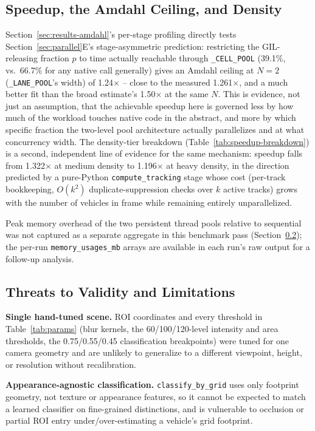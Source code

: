 \documentclass[conference]{IEEEtran}
\newcommand{\code}[1]{\texttt{#1}}
\begin{document}
\subsection{Speedup, the Amdahl Ceiling, and Density}
Section~\ref{sec:results-amdahl}'s per-stage profiling directly tests
Section~\ref{sec:parallel}E's stage-asymmetric prediction: restricting
the GIL-releasing fraction $p$ to time actually reachable through
\code{\_CELL\_POOL} (39.1\%, vs.\ 66.7\% for any native call generally)
gives an Amdahl ceiling at $N{=}2$ (\code{\_LANE\_POOL}'s width) of
1.24$\times$ -- close to the measured 1.261$\times$, and a much better
fit than the broad estimate's 1.50$\times$ at the same $N$. This is
evidence, not just an assumption, that the achievable speedup here is
governed less by how much of the workload touches native code in the
abstract, and more by which specific fraction the two-level pool
architecture actually parallelizes and at what concurrency width. The
density-tier breakdown (Table~\ref{tab:speedup-breakdown}) is a second,
independent line of evidence for the same mechanism: speedup falls from
1.322$\times$ at medium density to 1.196$\times$ at heavy density, in
the direction predicted by a pure-Python \code{compute\_tracking} stage
whose cost (per-track bookkeeping, $O(k^2)$ duplicate-suppression checks
over $k$ active tracks) grows with the number of vehicles in frame while
remaining entirely unparallelized.

Peak memory overhead of the two persistent thread pools relative to
sequential was not captured as a separate aggregate in this benchmark
pass (Section~\ref{sec:threats}); the per-run \code{memory\_usages\_mb}
arrays are available in each run's raw output for a follow-up analysis.

\subsection{Threats to Validity and Limitations}
\label{sec:threats}


\textbf{Single hand-tuned scene.} ROI coordinates and every threshold in
Table~\ref{tab:params} (blur kernels, the 60/100/120-level intensity and
area thresholds, the 0.75/0.55/0.45 classification breakpoints) were
tuned for one camera geometry and are unlikely to generalize to a
different viewpoint, height, or resolution without recalibration.

\textbf{Appearance-agnostic classification.} \code{classify\_by\_grid}
uses only footprint geometry, not texture or appearance features, so it
cannot be expected to match a learned classifier on fine-grained
distinctions, and is vulnerable to occlusion or partial ROI entry
under/over-estimating a vehicle's grid footprint.
\end{document}
